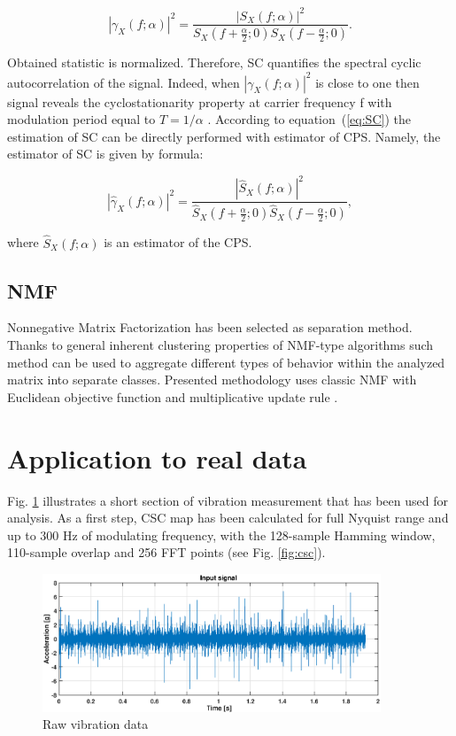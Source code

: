 \documentclass[10pt]{article}
\begin{document}
\begin{equation}
\label{eq:SC}
\left|\gamma_X(f;\alpha)\right|^{2}=\frac { \left|S_X(f;\alpha)\right|^2 }{ S_X(f+\frac{\alpha}{2};0)S_X(f-\frac{\alpha}{2};0)}.
\end{equation}

Obtained statistic is normalized. Therefore, SC quantifies the spectral cyclic autocorrelation of the signal. Indeed, when $\left|\gamma_X(f;\alpha)\right|^{2}$ is close to one then signal reveals the cyclostationarity property at carrier frequency f with modulation period equal to $T=1/\alpha$ .
According to equation~(\ref{eq:SC}) the estimation of SC can be directly performed with estimator of CPS. Namely, the estimator of SC is given by formula:

\begin{equation}
\left|\hat{\gamma}_X(f;\alpha)\right|^{2}=\frac{ \left|\hat{S}_X(f;\alpha)\right|^2 
}{\hat{S}_X(f+\frac{\alpha}{2};0)\hat{S}_X(f-\frac{\alpha}{2};0)},
\end{equation} 

where $\hat{S}_X(f;\alpha)$ is an estimator of the CPS.

\subsection{NMF}
Nonnegative Matrix Factorization has been selected as separation method. Thanks to general inherent clustering properties of NMF-type algorithms such method can be used to aggregate different types of behavior within the analyzed matrix into separate classes. Presented methodology uses classic NMF with Euclidean objective function and multiplicative update rule \cite{wodecki2017local}.

\section{Application to real data}

Fig. \ref{fig:raw} illustrates a short section of vibration measurement that has been used for analysis. As a first step, CSC map has been calculated for full Nyquist range and up to 300 Hz of modulating frequency, with the 128-sample Hamming window, 110-sample overlap and 256 FFT points (see Fig. \ref{fig:csc}).


\begin{figure}[h!]
\centering
\includegraphics[width=0.9\textwidth]{wykresy/raw}
\caption{Raw vibration data}
\label{fig:raw}
\end{figure}
\end{document}
